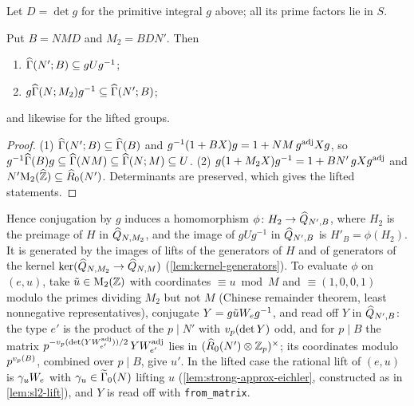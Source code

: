 Let $D = \det g$ for the primitive integral $g$ above; all its prime factors
lie in $S$.

\begin{lemma}[Bounds]\label{lem:centring-bounds}
Put $B = NMD$ and $M_2 = BDN'$. Then
\begin{enumerate}
\item $\GammaPrincipal[ad]{N'}{B} \subseteq gUg^{-1}$;
\item $g\GammaPrincipal[ad]{N}{M_2}g^{-1} \subseteq \GammaPrincipal[ad]{N'}{B}$;
\end{enumerate}
and likewise for the lifted groups.
\end{lemma}

\begin{proof}
(1) $\GammaPrincipal[ad]{N'}{B} \subseteq \GammaFull[ad]{B}$ and
$g^{-1}(1 + BX)g = 1 + NM\,g^{\mathrm{adj}}Xg$, so
$g^{-1}\GammaFull[ad]{B}g \subseteq \GammaFull[ad]{NM} \subseteq
\GammaPrincipal[ad]{N}{M} \subseteq U$. (2) $g(1 + M_2X)g^{-1} =
1 + BN'\,gXg^{\mathrm{adj}}$ and $N'\mathrm{M}_{2}(\widehat{\mathbb{Z}}) \subseteq
\widehat{R}_{0}(N')$. Determinants are preserved, which gives the lifted
statements.
\end{proof}

Hence conjugation by $g$ induces a homomorphism
$\phi \colon H_2 \to \widehat{Q}_{N',B}$, where $H_2$ is the preimage
of $H$ in $\widehat{Q}_{N,M_2}$, and the image of $gUg^{-1}$ in
$\widehat{Q}_{N',B}$ is $H'_B = \phi(H_2)$. It is generated by the
images of lifts of the generators of $H$ and of generators of the kernel
$\ker(\widehat{Q}_{N,M_2} \to \widehat{Q}_{N,M})$
(\cref{lem:kernel-generators}). To evaluate $\phi$ on $(e, u)$, take
$\tilde u \in \mathrm{M}_{2}(\mathbb{Z})$ with coordinates $\equiv u \bmod M$ and
$\equiv (1, 0, 0, 1)$ modulo the primes dividing $M_2$ but not $M$ (Chinese
remainder theorem, least nonnegative representatives), conjugate
$Y = g\tilde uW_{e}g^{-1}$, and read off $Y$ in
$\widehat{Q}_{N',B}$: the type $e'$ is the product of the $p \mid N'$
with $v_{p}(\det Y)$ odd, and for $p \mid B$ the matrix
$p^{-v_{p}(\det(YW_{e'}^{\mathrm{adj}}))/2}\,YW_{e'}^{\mathrm{adj}}$
lies in $(\widehat{R}_{0}(N')\otimes\mathbb{Z}_{p})^{\times}$; its
coordinates modulo $p^{v_{p}(B)}$, combined over $p \mid B$, give $u'$. In
the lifted case the rational lift of $(e, u)$ is
$\gamma_uW_{e}$ with $\gamma_u \in \GammaZero[lift]{N}$ lifting $u$
(\cref{lem:strong-approx-eichler}, constructed as in \cref{lem:sl2-lift}), and
$Y$ is read off with \texttt{from\_matrix}.

